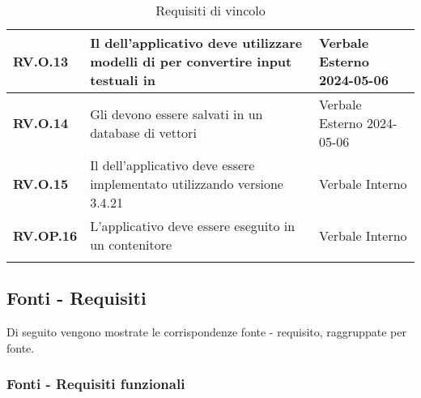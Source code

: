\begin{longtable}{|P{3cm}|P{6,5cm}|>{\arraybackslash}P{4cm}|}
  \hline
  \textbf{RV.O.13} & Il  dell'applicativo deve utilizzare modelli di  per convertire input testuali in  & Verbale Esterno 2024-05-06 \\
  \hline
  \textbf{RV.O.14} & Gli  devono essere salvati in un database di vettori & Verbale Esterno 2024-05-06 \\
  \hline
  \textbf{RV.O.15} & Il  dell'applicativo deve essere implementato utilizzando  versione 3.4.21 & Verbale Interno \\
  \hline
  \textbf{RV.OP.16} & L'applicativo deve essere eseguito in un contenitore  & Verbale Interno \\
  \hline
\caption{Requisiti di vincolo}
\label{requisitivincolo}
\end{longtable}

\subsection{Fonti - Requisiti}
Di seguito vengono mostrate le corrispondenze fonte - requisito, raggruppate per fonte.

\subsubsection{Fonti - Requisiti funzionali}

